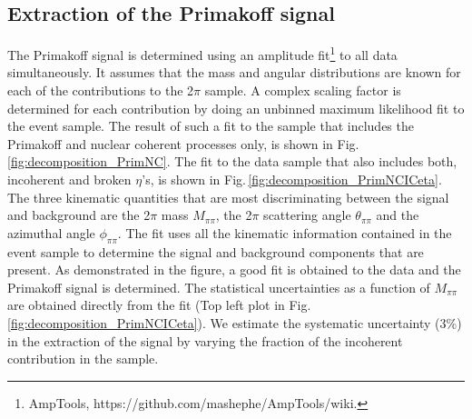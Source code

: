 \subsection{Extraction of the Primakoff signal \label{sec:signalfit}}
The Primakoff signal is determined using an amplitude fit\footnote{AmpTools, https://github.com/mashephe/AmpTools/wiki.} to all data simultaneously. It assumes that the mass and angular distributions are known for each of the contributions to the 2$\pi$ sample. A complex scaling factor is determined for each contribution by doing an unbinned maximum likelihood fit to the event sample. The result of such a fit to the sample that includes the Primakoff and nuclear coherent processes only, is shown in  Fig.\,\ref{fig:decomposition_PrimNC}. The fit to the data sample that also includes both, incoherent and broken $\eta$'s, is shown in Fig.\,\ref{fig:decomposition_PrimNCICeta}. The three kinematic quantities that are most discriminating between the signal and background are the 2$\pi$ mass $M_{\pi\pi}$, the 2$\pi$ scattering angle $\theta_{\pi\pi}$ and the azimuthal angle $\phi_{\pi\pi}$. The fit uses all the kinematic information contained in the event sample to determine the signal and background components that are present. As demonstrated in the figure, a good fit is obtained to the data and the Primakoff signal is determined. The statistical uncertainties as a function of $M_{\pi\pi}$ are obtained directly from the fit (Top left plot in Fig.\,\ref{fig:decomposition_PrimNCICeta}). We estimate the systematic uncertainty (3\%) in the extraction of the signal by varying the fraction of the incoherent contribution in the sample. 

